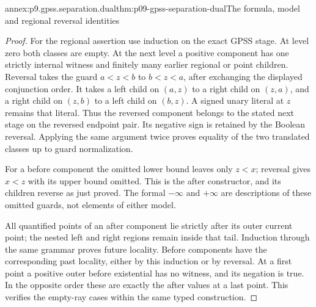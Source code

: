 \begin{annexitem}{annex:p9.gpss.separation.dual}{thm:p09-gpss-separation-dual}{The formula, model and regional reversal identities}
\begin{proof}
For the regional assertion use
induction on the exact GPSS stage.
At level zero both classes are
empty. At the next level a
positive component has one
strictly internal witness and
finitely many earlier regional
or point children. Reversal
takes the guard \(a<z<b\)
to \(b<z<a\), after exchanging
the displayed conjunction order.
It takes a left child on
\((a,z)\) to a right child
on \((z,a)\), and a right
child on \((z,b)\) to a
left child on \((b,z)\).
A signed unary literal at
\(z\) remains that literal.
Thus the reversed component
belongs to the stated next
stage on the reversed
endpoint pair. Its negative
sign is retained by the
Boolean reversal. Applying
the same argument twice
proves equality of the
two translated classes
up to guard normalization.

For a before component
the omitted lower bound
leaves only \(z<x\);
reversal gives \(x<z\)
with its upper bound
omitted. This is the
after constructor, and
its children reverse
as just proved. The
formal \(-\infty\)
and \(+\infty\)
are descriptions of
these omitted guards,
not elements of either
model.

All quantified points
of an after component
lie strictly after its
outer current point;
the nested left and
right regions remain
inside that tail.
Induction through the
same grammar proves
future locality.
Before components
have the corresponding
past locality, either
by this induction
or by reversal.
At a first point
a positive outer
before existential
has no witness,
and its negation
is true. In the
opposite order these
are exactly the
after values at
a last point.
This verifies the
empty-ray cases
within the same
typed construction.
\end{proof}
\end{annexitem}

